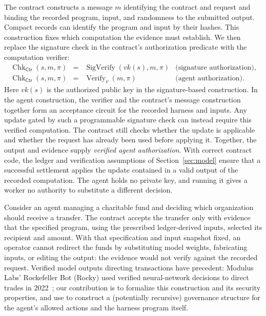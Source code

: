 \documentclass[10pt,letterpaper]{article}
\newcommand{\Verify}{\operatorname{Verify}}
\newcommand{\Ctr}{\mathsf{Ctr}}
\begin{document}
The contract constructs a message $m$ identifying the contract and request and binding the recorded program, input, and randomness to the submitted output. Compact records can identify the program and input by their hashes. This construction fixes which computation the evidence must establish. We then replace the signature check in the contract's authorization predicate with the computation verifier:
\[
\begin{array}{rcll}
 \operatorname{Chk}_{\Ctr}(s,m,\pi)&=&\operatorname{SigVerify}(vk(s),m,\pi)
    &\text{(signature authorization)},\\[2pt]
 \operatorname{Chk}_{\Ctr}(s,m,\pi)&=&\Verify_\nu(m,\pi)
    &\text{(agent authorization)}.
\end{array}
\]
Here $vk(s)$ is the authorized public key in the signature-based construction. In the agent construction, the verifier and the contract's message construction together form an acceptance circuit for the recorded harness and inputs. Any update gated by such a programmable signature check can instead require this verified computation. The contract still checks whether the update is applicable and whether the request has already been used before applying it. Together, the output and evidence supply \emph{verified agent authorization}. With correct contract code, the ledger and verification assumptions of Section~\ref{sec:model} ensure that a successful settlement applies the update contained in a valid output of the recorded computation. The agent holds no private key, and running it gives a worker no authority to substitute a different decision.

Consider an agent managing a charitable fund and deciding which organization should receive a transfer. The contract accepts the transfer only with evidence that the specified program, using the prescribed ledger-derived inputs, selected its recipient and amount. With that specification and input snapshot fixed, an operator cannot redirect the funds by substituting model weights, fabricating inputs, or editing the output: the evidence would not verify against the recorded request. Verified model outputs directing transactions have precedent: Modulus Labs' Rockefeller Bot (Rocky) used verified neural-network decisions to direct trades in 2022~\citep{rocky2022}; our contribution is to formalize this construction and its security properties, and use to construct a (potentially recursive) governance structure for the agent's allowed actions and the harness program itself.
\end{document}
